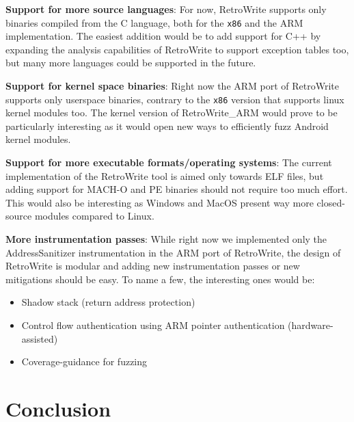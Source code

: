 \documentclass[a4paper,11pt,oneside]{report}
\newcommand{\sysname}{RetroWrite\xspace}
\begin{document}
{

\setlength{\parindent}{0cm}
\hangindent=0.7cm \textbf{Support for more source languages}: For now, 
\sysname supports only binaries compiled from the C language, both for the 
\texttt{x86} and the ARM implementation. The easiest addition would be to add 
support for C++ by expanding the analysis capabilities of \sysname to support 
exception tables too, but many more languages could be supported in the future. 

\hangindent=0.7cm \textbf{Support for kernel space binaries}: Right now the ARM 
port of \sysname supports only userspace binaries, contrary to the 
\texttt{x86} version that supports linux kernel modules too. The kernel version 
of \sysname\_ARM would prove to be particularly interesting as it would open 
new ways to efficiently fuzz Android kernel modules.

\hangindent=0.7cm \textbf{Support for more executable formats/operating 
systems}: The current implementation of the \sysname tool is aimed only 
towards ELF files, but adding support for MACH-O and PE binaries should not 
require too much effort. This would also be interesting as Windows and MacOS 
present way more closed-source modules compared to Linux.

\hangindent=0.7cm \textbf{More instrumentation passes}: While right now we 
implemented only the AddressSanitizer instrumentation in the ARM port of
\sysname, the design of \sysname is modular and adding new instrumentation 
passes or new mitigations should be easy. To name a few, the interesting ones would be:
\begin{itemize}
	\item Shadow stack (return address protection)
	\item Control flow authentication using ARM pointer authentication 
		(hardware-assisted)
	\item Coverage-guidance for fuzzing
\end{itemize}

}

\chapter{Conclusion}

\end{document}

